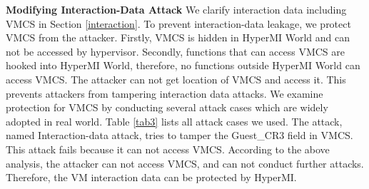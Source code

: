\documentclass[conference]{IEEEtran}
\begin{document}


\textbf{Modifying Interaction-Data Attack}
We clarify interaction data including VMCS in Section \ref{interaction}.
 To prevent interaction-data leakage, we protect VMCS from the attacker. Firstly, VMCS is hidden in HyperMI World and can not be accessed by hypervisor. Secondly, functions that can access VMCS are hooked into HyperMI World, therefore, no functions outside HyperMI World can access VMCS. The attacker can not get location of VMCS and access it. This prevents attackers from tampering interaction data attacks. We examine protection for VMCS by conducting several attack cases which are widely adopted in real world. Table \ref{tab3} lists all attack cases we used. The attack, named Interaction-data attack, tries to tamper the Guest\_CR3 field in VMCS. This attack fails because it can not access VMCS. 
  According to the above analysis, the attacker can not access VMCS, and can not conduct further attacks. Therefore, the VM interaction data can be protected by HyperMI.


\end{document}
